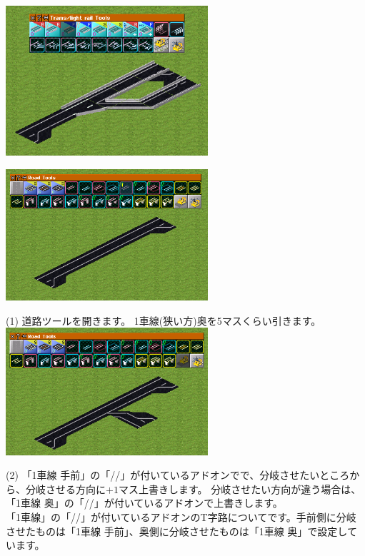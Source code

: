 \documentclass{jarticle}
\begin{document}
\includegraphics[width = 75mm]{picture/20210214-road-2-8.png}
\begin{multicols}{2}



\includegraphics[width = 75mm]{picture/20210214-road-2-1.png}

(1)
道路ツールを開きます。
1車線(狭い方)奥を5マスくらい引きます。\\



\includegraphics[width = 75mm]{picture/20210214-road-2-2.png}

(2)
「1車線 手前」の「//」が付いているアドオンでで、分岐させたいところから、分岐させる方向に$+1$マス上書きします。
分岐させたい方向が違う場合は、「1車線 奥」の「//」が付いているアドオンで上書きします。\\

「1車線」の「//」が付いているアドオンのT字路についてです。手前側に分岐させたものは「1車線 手前」、奥側に分岐させたものは「1車線 奥」で設定しています。\\




\end{multicols}
\end{document}

